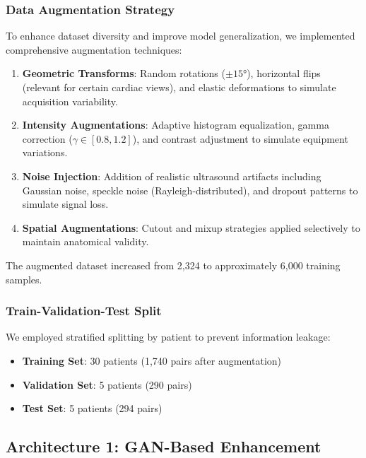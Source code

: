 \documentclass[10pt,conference,letterpaper]{IEEEtran}
\begin{document}
\subsubsection{Data Augmentation Strategy}

To enhance dataset diversity and improve model generalization, we implemented comprehensive augmentation techniques:

\begin{enumerate}
  \item \textbf{Geometric Transforms}: Random rotations ($\pm 15°$), horizontal flips (relevant for certain cardiac views), and elastic deformations to simulate acquisition variability.
  
  \item \textbf{Intensity Augmentations}: Adaptive histogram equalization, gamma correction ($\gamma \in [0.8, 1.2]$), and contrast adjustment to simulate equipment variations.
  
  \item \textbf{Noise Injection}: Addition of realistic ultrasound artifacts including Gaussian noise, speckle noise (Rayleigh-distributed), and dropout patterns to simulate signal loss.
  
  \item \textbf{Spatial Augmentations}: Cutout and mixup strategies applied selectively to maintain anatomical validity.
\end{enumerate}

The augmented dataset increased from 2,324 to approximately 6,000 training samples.

\subsubsection{Train-Validation-Test Split}

We employed stratified splitting by patient to prevent information leakage:
\begin{itemize}
  \item \textbf{Training Set}: 30 patients (1,740 pairs after augmentation)
  \item \textbf{Validation Set}: 5 patients (290 pairs)
  \item \textbf{Test Set}: 5 patients (294 pairs)
\end{itemize}

\subsection{Architecture 1: GAN-Based Enhancement}
\label{subsec:gan}
\end{document}
